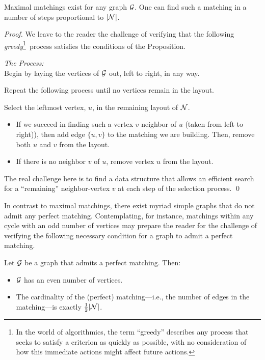 \begin{prop}
\label{thm:max-matching}
Maximal matchings exist for any graph $\mbox{$\cal G$}$.  One can find such a
matching in a number of steps proportional to $|\mbox{$\cal N$}|$.
\end{prop}

\begin{proof}
We leave to the reader the challenge of verifying that the following
{\em greedy}\footnote{\label{foot:greedy}In the world of algorithmics, the term ``greedy''
describes any process that seeks to satisfy a criterion as quickly as possible, with no consideration
of how this immediate actions might affect future actions.}~process satisfies the
conditions of the Proposition.
\medskip

\noindent
{\it The Process:} \\
Begin by laying the vertices of $\mbox{$\cal G$}$ out, left to right, in any way.

\noindent
Repeat the following process until no vertices remain in the layout.

\noindent
Select the leftmost vertex, $u$, in the remaining layout of $\mbox{$\cal N$}$.
  \begin{itemize}
  \item
If we succeed in finding such a vertex $v$ neighbor of $u$ (taken from left to right)), 
then add edge $\{u,v\}$ to the matching we are building.  
Then, remove both $u$ and $v$ from the layout.
  \item
If there is no neighbor $v$ of $u$, remove vertex $u$ from the layout.
  \end{itemize}
The real challenge here is to find a data structure that allows an
efficient search for a ``remaining'' neighbor-vertex $v$ at each step of
the selection process.
\qed
\end{proof}

\medskip

In contrast to maximal matchings, there exist myriad simple graphs
that do not admit any perfect matching.  Contemplating, for instance,
matchings within any cycle with an odd number of vertices may prepare the
reader for the challenge of verifying the following necessary
condition for a graph to admit a perfect matching.

\begin{prop}
\label{thm:necessary-for-perfect-matching}
Let $\mbox{$\cal G$}$ be a graph that admits a perfect matching.  Then:
\begin{itemize}
\item
$\mbox{$\cal G$}$ has an even number of vertices.
\item
The cardinality of the (perfect) matching---i.e., the number of edges
in the matching---is exactly
$\frac{1}{2}|\mbox{$\cal N$}|$.
\end{itemize}
\end{prop}


